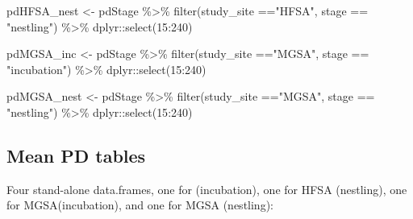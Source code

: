 \documentclass[
]{article}
\newenvironment{Shaded}{\begin{snugshade}}{\end{snugshade}}
\newcommand{\FunctionTok}[1]{\textcolor[rgb]{0.00,0.00,0.00}{#1}}
\newcommand{\NormalTok}[1]{#1}
\newcommand{\OtherTok}[1]{\textcolor[rgb]{0.56,0.35,0.01}{#1}}
\newcommand{\SpecialCharTok}[1]{\textcolor[rgb]{0.00,0.00,0.00}{#1}}
\newcommand{\StringTok}[1]{\textcolor[rgb]{0.31,0.60,0.02}{#1}}
\begin{document}
\begin{Shaded}
\begin{Highlighting}[]
\NormalTok{pdHFSA\_nest }\OtherTok{\textless{}{-}}\NormalTok{ pdStage }\SpecialCharTok{\%\textgreater{}\%} 
  \FunctionTok{filter}\NormalTok{(study\_site }\SpecialCharTok{==}\StringTok{"HFSA"}\NormalTok{, stage }\SpecialCharTok{==} \StringTok{"nestling"}\NormalTok{) }\SpecialCharTok{\%\textgreater{}\%}
\NormalTok{  dplyr}\SpecialCharTok{::}\FunctionTok{select}\NormalTok{(}\StringTok{\textquotesingle{}15\textquotesingle{}}\SpecialCharTok{:}\StringTok{\textquotesingle{}240\textquotesingle{}}\NormalTok{)}

\NormalTok{pdMGSA\_inc }\OtherTok{\textless{}{-}}\NormalTok{ pdStage }\SpecialCharTok{\%\textgreater{}\%}
  \FunctionTok{filter}\NormalTok{(study\_site }\SpecialCharTok{==}\StringTok{"MGSA"}\NormalTok{, stage }\SpecialCharTok{==} \StringTok{"incubation"}\NormalTok{) }\SpecialCharTok{\%\textgreater{}\%}
\NormalTok{  dplyr}\SpecialCharTok{::}\FunctionTok{select}\NormalTok{(}\StringTok{\textquotesingle{}15\textquotesingle{}}\SpecialCharTok{:}\StringTok{\textquotesingle{}240\textquotesingle{}}\NormalTok{)}
         
\NormalTok{pdMGSA\_nest }\OtherTok{\textless{}{-}}\NormalTok{ pdStage }\SpecialCharTok{\%\textgreater{}\%}
  \FunctionTok{filter}\NormalTok{(study\_site }\SpecialCharTok{==}\StringTok{"MGSA"}\NormalTok{, stage }\SpecialCharTok{==} \StringTok{"nestling"}\NormalTok{) }\SpecialCharTok{\%\textgreater{}\%}
\NormalTok{  dplyr}\SpecialCharTok{::}\FunctionTok{select}\NormalTok{(}\StringTok{\textquotesingle{}15\textquotesingle{}}\SpecialCharTok{:}\StringTok{\textquotesingle{}240\textquotesingle{}}\NormalTok{)}
\end{Highlighting}
\end{Shaded}

\hypertarget{mean-pd-tables-1}{%
\subsection{Mean PD tables}\label{mean-pd-tables-1}}

Four stand-alone data.frames, one for (incubation), one for HFSA
(nestling), one for MGSA(incubation), and one for MGSA (nestling):
\end{document}
